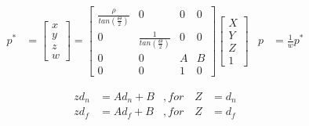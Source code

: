 \begin{align}
    p^* &= \begin{bmatrix}
        x \\ y \\ z \\ w
    \end{bmatrix} = \begin{bmatrix}
        \frac{\rho}{tan\left(\frac{\Theta}{2}\right)}& 0 & 0 & 0 \\
        0 & \frac{1}{tan\left(\frac{\Theta}{2}\right)}& 0 & 0 \\
        0 & 0 & A & B \\
        0 & 0 & 1 & 0
    \end{bmatrix} \begin{bmatrix}
        X \\ Y \\ Z \\ 1
    \end{bmatrix} & p &= \frac{1}{w}p^* \label{eq:perspective_projmat_temp}
\end{align}


\begin{equation}
    \begin{aligned}
        zd_n &= Ad_n + B &, for \quad Z &= d_n \\
        zd_f &= Ad_f + B &, for \quad Z &= d_f
    \end{aligned}
    \label{eq:perspective_zeqs}
\end{equation}







